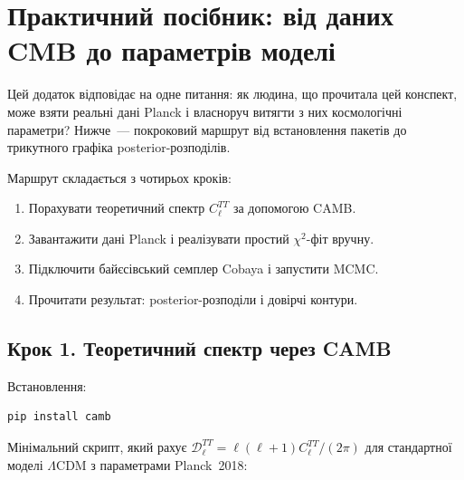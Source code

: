 
\chapter{Практичний посібник: від даних CMB до параметрів моделі}
\label{sec:practical}

Цей додаток відповідає на одне питання: як людина, що прочитала
цей конспект, може взяти реальні дані Planck і власноруч
витягти з них космологічні параметри? Нижче~--- покроковий
маршрут від встановлення пакетів до трикутного графіка
posterior-розподілів.

Маршрут складається з чотирьох кроків:
\begin{enumerate}
  \item Порахувати теоретичний спектр $C_\ell^{TT}$ за допомогою CAMB.
  \item Завантажити дані Planck і реалізувати простий $\chi^2$-фіт вручну.
  \item Підключити байєсівський семплер Cobaya і запустити MCMC.
  \item Прочитати результат: posterior-розподіли і довірчі контури.
\end{enumerate}

\section{Крок 1. Теоретичний спектр через CAMB}

Встановлення:
\begin{verbatim}
pip install camb
\end{verbatim}

Мінімальний скрипт, який рахує $\mathcal{D}_\ell^{TT}
= \ell(\ell+1)C_\ell^{TT}/(2\pi)$ для стандартної моделі
$\Lambda$CDM з параметрами Planck~2018:

